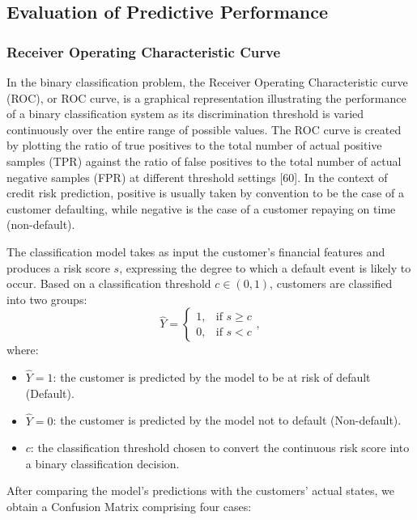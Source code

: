 \subsection{Evaluation of Predictive Performance}

\subsubsection{Receiver Operating Characteristic Curve}
\noindent
In the binary classification problem, the Receiver Operating Characteristic curve (ROC), or ROC curve, is a graphical representation illustrating the performance of a binary classification system as its discrimination threshold is varied continuously over the entire range of possible values. The ROC curve is created by plotting the ratio of true positives to the total number of actual positive samples (TPR) against the ratio of false positives to the total number of actual negative samples (FPR) at different threshold settings [60]. In the context of credit risk prediction, positive is usually taken by convention to be the case of a customer defaulting, while negative is the case of a customer repaying on time (non-default).

The classification model takes as input the customer's financial features and produces a risk score $s$, expressing the degree to which a default event is likely to occur. Based on a classification threshold $c \in (0,1)$, customers are classified into two groups:
\begin{equation}
    \hat{Y}= \begin{cases} 1, & \text{if } s\geq c\\ 0, & \text{if } s<c \end{cases},
\end{equation}
where:
\begin{itemize}
    \item $\hat{Y}=1$: the customer is predicted by the model to be at risk of default (Default).
    \item $\hat{Y}=0$: the customer is predicted by the model not to default (Non-default).
    \item $c$: the classification threshold chosen to convert the continuous risk score into a binary classification decision.

\end{itemize}

\vspace{1em}
After comparing the model's predictions with the customers' actual states, we obtain a Confusion Matrix comprising four cases:

